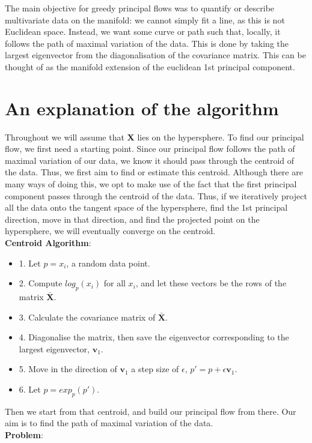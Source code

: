\documentclass[12pt]{report}
\begin{document}
The main objective for greedy principal flows was to quantify or describe 
multivariate data on the manifold: we cannot simply fit a line, 
as this is not Euclidean space.
Instead, we want some curve or path such that, 
locally, it follows the path of maximal variation of the data. 
This is done by taking the largest eigenvector from the diagonalisation of the covariance matrix.
This can be thought of as the manifold extension of the euclidean 1st principal component.

\section{An explanation of the algorithm}

Throughout we will assume that \textbf{X} lies on the hypersphere. 
To find our principal flow, we first need a starting point. Since our principal flow 
follows the path of maximal variation of our data, 
we know it should pass through the centroid of the data. 
Thus, we first aim to find or estimate this centroid.
Although there are many ways of doing this, we opt to make use of the fact that 
the first principal component passes through the centroid of the data. Thus, if we 
iteratively project all the data onto the tangent space of the hypersphere, 
find the 1st principal direction, move in that direction, 
and find the projected point on the hypersphere, we will eventually converge on the 
centroid.
\\
\textbf{Centroid Algorithm}:
\begin{itemize}
    \item 1. Let $p = x_i$, a random data point.
    \item 2. Compute $log_p(x_i)$ for all $x_i$, and let these vectors be the rows of the matrix $\bar{\textbf{X}}$.
    \item 3. Calculate the covariance matrix of $\bar{\textbf{X}}$.
    \item 4. Diagonalise the matrix, then save the eigenvector corresponding to the largest eigenvector, $\textbf{v}_1$.
    \item 5. Move in the direction of $\textbf{v}_1$ a step size of $\epsilon$, $p' = p + \epsilon \textbf{v}_1$.
    \item 6. Let $p = exp_p(p')$.
\end{itemize}
Then we start from that centroid, and build our principal flow from there.
Our aim is to find the path of maximal variation of the data.\\
\textbf{Problem}:\\
\end{document}
